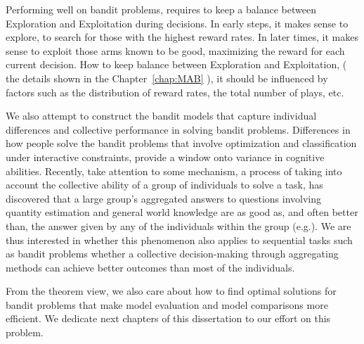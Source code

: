 Performing well on bandit problems, requires to keep a balance between Exploration and Exploitation during decisions. In early steps, it makes sense to explore, to search for those with the highest reward rates. In later times, it makes sense to exploit those arms known to be good, maximizing the reward for each current decision. How to keep balance between Exploration and Exploitation, ( the details shown in the Chapter~\ref{chap:MAB} ), it should be influenced by factors such as the distribution of reward rates, the total number of plays, etc.

We also attempt to construct the bandit models that capture individual differences and collective performance in solving bandit problems. Differences in how people solve the bandit problems that involve optimization and classification under interactive constraints, provide a window onto variance in cognitive abilities. Recently, take attention to some mechanism, a process of taking into account the collective ability of a group of individuals to solve a task, has discovered that a large group's aggregated answers to questions involving quantity estimation and general world knowledge are as good as, and often better than, the answer given by any of the individuals within the group (e.g.\cite{surowiecki2005wisdom}). We are thus interested in whether this phenomenon also applies to sequential tasks such as bandit problems whether a collective decision-making through aggregating methods can achieve better outcomes than most of the individuals.

From the theorem view, we also care about how to find optimal solutions for bandit problems that make model evaluation and model comparisons more efficient. We dedicate next chapters of this dissertation to our effort on this problem.